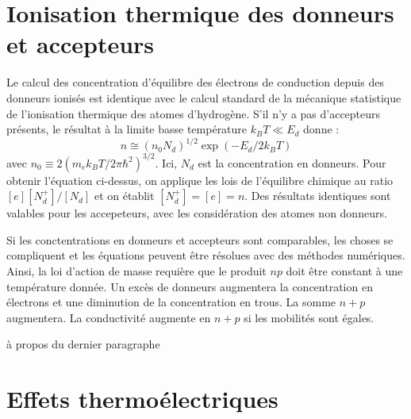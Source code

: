 \section{Ionisation thermique des donneurs et accepteurs}

Le calcul des concentration d'équilibre des électrons de conduction depuis des
donneurs ionisés est identique avec le calcul standard de la mécanique
statistique de l'ionisation thermique des atomes d'hydrogène. S'il n'y a pas
d'accepteurs présents, le résultat à la limite basse température $k_BT \ll E_d$
donne :
\begin{equation}
    n \cong (n_0N_d)^{1/2} \exp (-E_d / 2k_BT)
\end{equation}
avec $n_0 \equiv 2(m_ek_BT/2\pi\hbar^2)^{3/2}$. Ici, $N_d$ est la concentration
en donneurs. Pour obtenir l'équation ci-dessus, on applique les lois de
l'équilibre chimique au ratio $[e][N_d^+]/[N_d]$ et on établit $[N_d^+]=[e]=n$.
Des résultats identiques sont valables pour les accepeteurs, avec les
considération des atomes non donneurs.

Si les conctentrations en donneurs et accepteurs sont comparables, les choses se
compliquent et les équations peuvent être résolues avec des méthodes numériques.
Ainsi, la loi d'action de masse requière que le produit $np$ doit être constant à
une température donnée. Un excès de donneurs augmentera la concentration en
électrons et une diminution de la concentration en trous. La somme $n+p$
augmentera. La conductivité augmente en $n+p$ si les mobilités sont égales.

\begin{marginfigure}
    \TODO
    \caption{à propos du dernier paragraphe}
    \label{trucmuche}
\end{marginfigure}

\section{Effets thermoélectriques}

